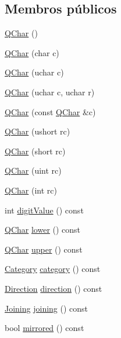 \subsection*{Membros públicos}
\begin{DoxyCompactItemize}
\item 
\hyperlink{class_q_char_adaa0cc5729f4746a1196aaadb6377a60}{Q\-Char} ()
\item 
\hyperlink{class_q_char_ab945375839902ed08d3529ddb968ee1a}{Q\-Char} (char c)
\item 
\hyperlink{class_q_char_a983bba29246ef450eb377c4626ce97ad}{Q\-Char} (uchar c)
\item 
\hyperlink{class_q_char_ae133c8c7b3842408a01ce436f63f3e01}{Q\-Char} (uchar c, uchar r)
\item 
\hyperlink{class_q_char_acd561f4286b5a6b3a038131f9021f0d2}{Q\-Char} (const \hyperlink{class_q_char}{Q\-Char} \&c)
\item 
\hyperlink{class_q_char_ac0b042f68e50c5f2f32da5a8835d6457}{Q\-Char} (ushort rc)
\item 
\hyperlink{class_q_char_ae8d18e6e881998bab544a27fb3f798a2}{Q\-Char} (short rc)
\item 
\hyperlink{class_q_char_a6b943606f299817d65c9ac00dc651f7b}{Q\-Char} (uint rc)
\item 
\hyperlink{class_q_char_a5ff58c2eb0391089319517009b1b4564}{Q\-Char} (int rc)
\item 
int \hyperlink{class_q_char_aa9f0b380bc69d7b7ed21313c9c2cdd8c}{digit\-Value} () const 
\item 
\hyperlink{class_q_char}{Q\-Char} \hyperlink{class_q_char_a10df978cce889ffe3308eaab00829926}{lower} () const 
\item 
\hyperlink{class_q_char}{Q\-Char} \hyperlink{class_q_char_ac3676fc22ef9ffe55c28b8e70dd66f45}{upper} () const 
\item 
\hyperlink{class_q_char_a9ca8f05608edcbf85ab6c2c85a439ccb}{Category} \hyperlink{class_q_char_a2a8a6abd50e8b95aa26ac2e14506c7a4}{category} () const 
\item 
\hyperlink{class_q_char_a224b9163917ac32fc95a60d8c1eec3aa}{Direction} \hyperlink{class_q_char_ab6fb1bffa65c7a841ce816ad15b0a2cb}{direction} () const 
\item 
\hyperlink{class_q_char_a7cb8fbdfaf179409190a2321ae0a10ed}{Joining} \hyperlink{class_q_char_a4e8aadfd094cc81e6d8d53a912bbbe32}{joining} () const 
\item 
bool \hyperlink{class_q_char_a1c8640d63d0a27963a2cdeb680fa399e}{mirrored} () const 
\item 

\end{DoxyCompactItemize}
